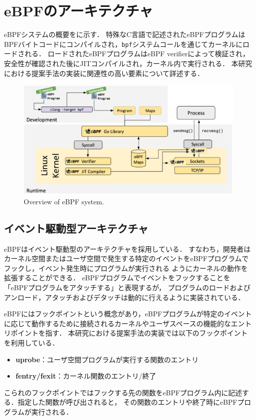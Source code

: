 \section{eBPFのアーキテクチャ}
eBPFシステムの概要をに示す．
特殊なC言語で記述されたeBPFプログラムはBPFバイトコードにコンパイルされ，\texttt{bpf}システムコールを通じてカーネルにロードされる．
ロードされたeBPFプログラムはeBPF verifierによって検証され，安全性が確認された後にJITコンパイルされ，カーネル内で実行される．
本研究における提案手法の実装に関連性の高い要素について詳述する．
\begin{figure}[t]
  \begin{center}
    \includegraphics[width=\columnwidth]{doc/img/ebpf-overview.eps}
  \end{center}
  \caption{Overview of eBPF system. \cite{WhatiseB81:online}}
  \label{fig:ebpf-overview}
\end{figure}

\subsection{イベント駆動型アーキテクチャ}
eBPFはイベント駆動型のアーキテクチャを採用している．
すなわち，開発者はカーネル空間またはユーザ空間で発生する特定のイベントをeBPFプログラムでフックし，イベント発生時にプログラムが実行される
ようにカーネルの動作を拡張することができる．
eBPFプログラムでイベントをフックすることを「eBPFプログラムをアタッチする」と表現するが，
プログラムのロードおよびアンロード，アタッチおよびデタッチは動的に行えるように実装されている．

eBPFにはフックポイントという概念があり，eBPFプログラムが特定のイベントに応じて動作するために接続されるカーネルやユーザスペースの機能的なエントリポイントを指す．
本研究における提案手法の実装では以下のフックポイントを利用している．
\begin{itemize}
  \item \textbf{uprobe}：ユーザ空間プログラムが実行する関数のエントリ
  \item \textbf{fentry/fexit}：カーネル関数のエントリ/終了
\end{itemize}
こられのフックポイントではフックする先の関数をeBPFプログラム内に記述する．指定した関数が呼び出されると，
その関数のエントリや終了時にeBPFプログラムが実行される．

